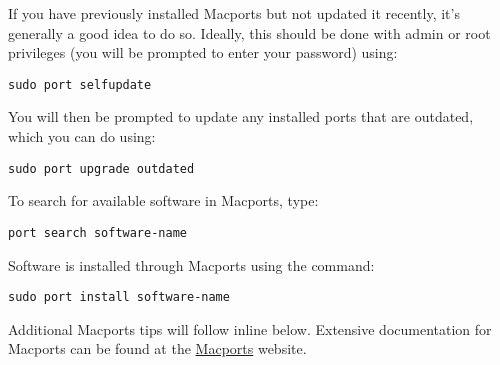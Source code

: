 \begin{mdframed}[style=mac]
If you have previously installed Macports but not updated it recently, it's generally a good idea to do so. Ideally, this should be done with admin or root privileges (you will be prompted to enter your password) using:

\texttt{sudo port selfupdate}

\noindent
You will then be prompted to update any installed ports that are outdated, which you can do using:

\texttt{sudo port upgrade outdated}

\noindent
To search for available software in Macports, type: 

\texttt{port search software-name}

\noindent
Software is installed through Macports using the command:

\texttt{sudo port install software-name}

\noindent
Additional Macports tips will follow inline below. Extensive documentation for Macports 
can be found at the \href{http://guide.macports.org}{Macports} website.
\end{mdframed}              %


